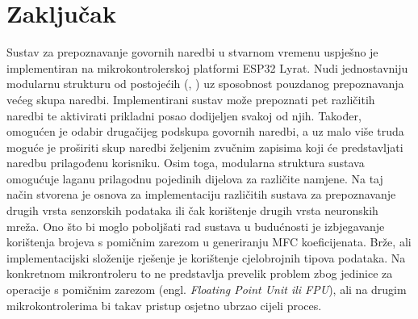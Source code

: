 \chapter{Zaključak}
\label{pog:zakljucak}

Sustav za prepoznavanje govornih naredbi u stvarnom vremenu uspješno je implementiran
na mikrokontrolerskoj platformi ESP32 Lyrat. Nudi jednostavniju modularnu
strukturu od postojećih (\cite{arm_kws}, \cite{tflmicrospeech}) uz sposobnost pouzdanog 
prepoznavanja većeg skupa
naredbi. Implementirani sustav može prepoznati pet
različitih naredbi te aktivirati prikladni posao dodijeljen svakoj od njih. 
Također, omogućen je odabir 
drugačijeg podskupa govornih naredbi, a uz malo više truda moguće je proširiti skup naredbi
željenim zvučnim zapisima koji će predstavljati naredbu prilagođenu korisniku.
Osim toga, modularna struktura sustava
omogućuje laganu prilagodnu pojedinih dijelova za različite namjene. Na taj način stvorena je
osnova za implementaciju različitih sustava za prepoznavanje drugih vrsta senzorskih podataka
ili čak korištenje drugih vrsta neuronskih mreža. Ono što bi moglo poboljšati rad sustava
u budućnosti je
izbjegavanje korištenja brojeva s pomičnim zarezom u generiranju MFC koeficijenata. Brže, ali 
implementacijski složenije rješenje je korištenje cjelobrojnih tipova podataka. Na konkretnom
mikrontroleru to ne predstavlja prevelik problem zbog jedinice
za operacije s pomičnim zarezom (engl. \textit{Floating Point Unit ili FPU}),
ali na drugim mikrokontrolerima bi takav pristup osjetno ubrzao cijeli proces.


